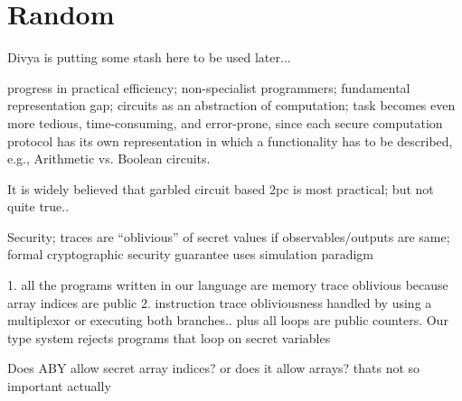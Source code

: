 \section{Random}

Divya is putting some stash here to be used later...

 progress in practical efficiency; non-specialist programmers; fundamental representation gap; circuits as an abstraction of computation; task becomes even more tedious, time-consuming, and error-prone,
since each secure computation protocol has its own
representation in which a functionality has to be described, e.g.,
Arithmetic vs. Boolean circuits.

 It is widely believed that garbled circuit based 2pc is most practical; but not quite true..

 Security; traces are ``oblivious'' of secret values if observables/outputs are same; formal cryptographic security guarantee uses simulation paradigm \cite{canetti2000} 


 1. all the programs written in our language are memory trace oblivious because array indices are public 2. instruction trace obliviousness handled by using a multiplexor or executing both branches.. plus all loops are public counters. Our type system rejects programs that loop on secret variables

 Does ABY allow secret array indices? or does it allow arrays? thats not so important actually






